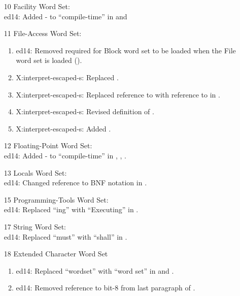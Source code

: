 \begin{itemize}
	\item[10] Facility Word Set:					%
		~ \\
		\textsf{ed14}: Added - to ``compile-time'' in
			 and 

	\item[11] File-Access Word Set:				%
		\begin{enumerate}
		\item \textsf{ed14}: Removed required for Block word set to be
			loaded when the File word set is loaded ().
		\item \textsf{X:interpret-escaped-s}: Replaced .
		\item \textsf{X:interpret-escaped-s}: Replaced reference to  with
			reference to  in .
		\item \textsf{X:interpret-escaped-s}: Revised definition of .
		\item \textsf{X:interpret-escaped-s}: Added .
		\end{enumerate}

	\item[12] Floating-Point Word Set:				%
		~\\
		\textsf{ed14}: Added - to ``compile-time'' in
			,
			,
			.

	\item[13] Locals Word Set:						%
		~\\ \textsf{ed14}: Changed reference to BNF notation in .

	\item[15] Programming-Tools Word Set:			%
~\\
	\textsf{ed14}: Replaced ``ing'' with ``Executing''
		in .


	\item[17] String Word Set:						%
		~\\ \textsf{ed14}: Replaced ``must'' with ``shall'' in .

	\item[18] Extended Character Word Set			%
		\begin{enumerate}
		\item \textsf{ed14}: Replaced ``wordset'' with ``word set'' in 
			and .
		\item \textsf{ed14}: Removed reference to bit-8 from last paragraph of
			.
		\end{enumerate}
		

\end{itemize}
